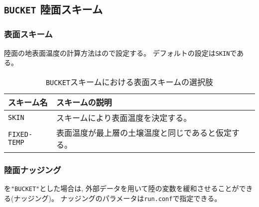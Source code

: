 \subsection{\texttt{BUCKET} 陸面スキーム}
\subsubsection{表面スキーム}

陸面の地表面温度の計算方法はので設定する。
デフォルトの設定は\verb|SKIN|である。
%
\begin{table}[hbt]
\begin{center}
  \caption{\texttt{BUCKET}スキームにおける表面スキームの選択肢}
  \label{tab:nml_land_sfc}
  \begin{tabularx}{150mm}{lX} \hline
    \rowcolor[gray]{0.9}  スキーム名 & スキームの説明 \\ \hline
      \verb|SKIN|       & スキームにより表面温度を決定する。 \\
      \verb|FIXED-TEMP| & 表面温度が最上層の土壌温度と同じであると仮定する。 \\
    \hline
  \end{tabularx}
\end{center}
\end{table}


\subsubsection{陸面ナッジング}

を\verb|"BUCKET"|とした場合は,
外部データを用いて陸の変数を緩和させることができる(ナッジング)。
ナッジングのパラメータは\verb|run.conf|で指定できる。

